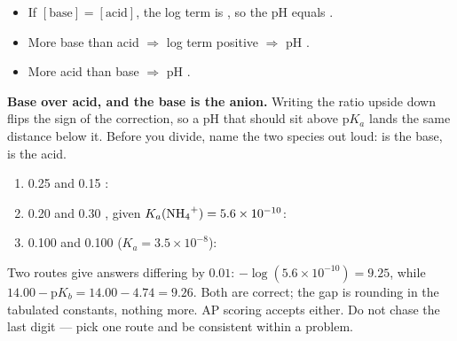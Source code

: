 \documentclass{apchem-notes}
\begin{document}
\begin{itemize}[leftmargin=*,itemsep=0.3em]
  \item If $[\text{base}] = [\text{acid}]$, the log term is
        , so the pH equals
        .
  \item More base than acid $\Rightarrow$ log term positive $\Rightarrow$ pH
        .
  \item More acid than base $\Rightarrow$ pH
        .
\end{itemize}

\begin{apctrap}
\textbf{Base over acid, and the base is the anion.} Writing the ratio upside
down flips the sign of the correction, so a pH that should sit above p$K_a$
lands the same distance below it. Before you divide, name the two species
out loud:  is the base,  is the acid.
\end{apctrap}


\begin{enumerate}[leftmargin=*,itemsep=0.4em]
  \item \SI{0.25}{\Molar}  and \SI{0.15}{\Molar}
        : \workspace[1.8cm]
  \item \SI{0.20}{\Molar}  and \SI{0.30}{\Molar} , given
        $K_a(\ce{NH4+}) = 5.6\times10^{-10}$: \workspace[1.8cm]
  \item \SI{0.100}{\Molar}  and \SI{0.100}{\Molar} 
        ($K_a = 3.5\times10^{-8}$): 
\end{enumerate}

\begin{apcnote}
Two routes give answers differing by $0.01$: $-\log(5.6\times10^{-10}) =
9.25$, while $14.00 - \mathrm{p}K_b = 14.00 - 4.74 = 9.26$. Both are
correct; the gap is rounding in the tabulated constants, nothing more. AP
scoring accepts either. Do not chase the last digit --- pick one route and
be consistent within a problem.
\end{apcnote}
\end{document}
